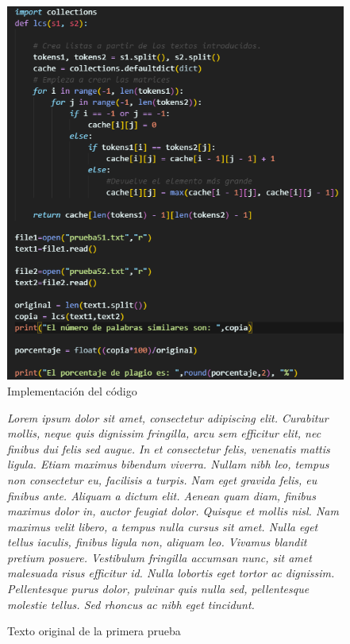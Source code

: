\documentclass[12pt,twoside]{article}
\begin{document}
\begin{figure}[ht]
    \centering
    \includegraphics[width=1\textwidth]{codigo.png}
    \caption{Implementaci\'on del c\'odigo}
    \label{fig:codigo}
\end{figure}

\begin{figure}
    \centering
    \textit{Lorem ipsum dolor sit amet, consectetur adipiscing elit. 
Curabitur mollis, neque quis dignissim fringilla, arcu sem 
efficitur elit, nec finibus dui felis sed augue. In et consectetur 
felis, venenatis mattis ligula. Etiam maximus bibendum viverra. 
Nullam nibh leo, tempus non consectetur eu, facilisis a turpis. 
Nam eget gravida felis, eu finibus ante. Aliquam a dictum elit. 
Aenean quam diam, finibus maximus dolor in, auctor feugiat dolor. 
Quisque et mollis nisl. Nam maximus velit libero, a tempus nulla 
cursus sit amet. Nulla eget tellus iaculis, finibus ligula non, 
aliquam leo. Vivamus blandit pretium posuere. Vestibulum fringilla 
accumsan nunc, sit amet malesuada risus efficitur id. Nulla 
lobortis eget tortor ac dignissim. Pellentesque purus dolor, 
pulvinar quis nulla sed, pellentesque molestie tellus. Sed rhoncus 
ac nibh eget tincidunt.}
    \caption{Texto original de la primera prueba}
    \label{fig:texto11}
\end{figure}
\end{document}

